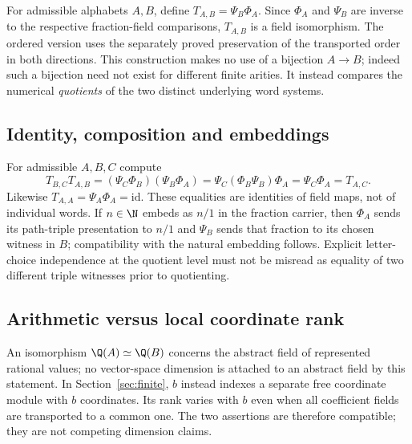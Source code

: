 For admissible alphabets $A,B$, define $T_{A,B}=\Psi_B\Phi_A$. Since $\Phi_A$ and $\Psi_B$ are inverse to the respective fraction-field comparisons, $T_{A,B}$ is a field isomorphism. The ordered version uses the separately proved preservation of the transported order in both directions. This construction makes no use of a bijection $A\to B$; indeed such a bijection need not exist for different finite arities. It instead compares the numerical \emph{quotients} of the two distinct underlying word systems.

\subsection{Identity, composition and embeddings}\label{supp:7-2}
\par{}\par\smallskip

For admissible $A,B,C$ compute
\[
T_{B,C}T_{A,B}=(\Psi_C\Phi_B)(\Psi_B\Phi_A)=\Psi_C(\Phi_B\Psi_B)\Phi_A=\Psi_C\Phi_A=T_{A,C}.
\]
Likewise $T_{A,A}=\Psi_A\Phi_A=\mathrm{id}$. These equalities are identities of field maps, not of individual words. If $n\in\N$ embeds as $n/1$ in the fraction carrier, then $\Phi_A$ sends its path-triple presentation to $n/1$ and $\Psi_B$ sends that fraction to its chosen witness in $B$; compatibility with the natural embedding follows. Explicit letter-choice independence at the quotient level must not be misread as equality of two different triple witnesses prior to quotienting.

\subsection{Arithmetic versus local coordinate rank}\label{supp:7-3}
\par{}\par\smallskip

An isomorphism $\Q(A)\simeq\Q(B)$ concerns the abstract field of represented rational values; no vector-space dimension is attached to an abstract field by this statement. In Section~\ref{sec:finite}, $b$ instead indexes a separate free coordinate module with $b$ coordinates. Its rank varies with $b$ even when all coefficient fields are transported to a common one. The two assertions are therefore compatible; they are not competing dimension claims.

